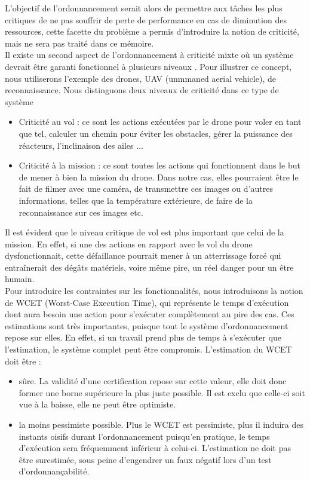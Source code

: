 \documentclass[11pt,a4paper,oneside]{book}
\theoremstyle{break}
\theoremstyle{breakplain}
\begin{document}
L'objectif de l'ordonnancement serait alors de permettre aux tâches les plus critiques de ne pas souffrir de perte de performance en cas de diminution des ressources, cette facette du problème a permis d'introduire la notion de criticité, mais ne sera pas traité dans ce mémoire.\\

Il existe un second aspect de l'ordonnancement à criticité mixte où un système devrait être garanti fonctionnel à plusieurs niveaux \cite{barhorst2009research}. Pour illustrer ce concept, nous utiliserons l'exemple des drones, UAV (unmmaned aerial vehicle), de reconnaissance. Nous distinguons deux niveaux de criticité dans ce type de système

\begin{itemize}
\item Criticité au vol : ce sont les actions exécutées par le drone pour voler en tant que tel, calculer un chemin pour éviter les obstacles, gérer la puissance des réacteurs, l'inclinaison des ailes ...
\item Criticité à la mission : ce sont toutes les actions qui fonctionnent dans le but de mener à bien la mission du drone. Dans notre cas, elles pourraient être le fait de filmer avec une caméra, de transmettre ces images ou d'autres informations, telles que la température extérieure, de faire de la reconnaissance sur ces images etc.\\
\end{itemize}

Il est évident que le niveau critique de vol est plus important que celui de la mission. En effet, si une des actions en rapport avec le vol du drone dysfonctionnait, cette défaillance pourrait mener à un atterrissage forcé qui entraînerait des dégâts matériels, voire même pire, un réel danger pour un être humain.\\

Pour introduire les contraintes sur les fonctionnalités, nous introduisons la notion de WCET (Worst-Case Execution Time), qui représente le temps d'exécution dont aura besoin une action pour s'exécuter complètement au pire des cas. Ces estimations sont très importantes, puisque tout le système d'ordonnancement repose sur elles. En effet, si un travail prend plus de temps à s'exécuter que l'estimation, le système complet peut être compromis. L'estimation du WCET doit être \cite{santy2012ordonnancement} :

\begin{itemize}
\item sûre. La validité d'une certification repose sur cette valeur, elle doit donc former une borne supérieure la plus juste possible. Il est exclu que celle-ci soit vue à la baisse, elle ne peut être optimiste.
\item la moins pessimiste possible. Plus le WCET est pessimiste, plus il induira des instants oisifs durant l'ordonnancement puisqu'en pratique, le temps d'exécution sera fréquemment inférieur à celui-ci. L'estimation ne doit pas être surestimée, sous peine d'engendrer un faux négatif lors d'un test d'ordonnançabilité.\\
\end{itemize}
\end{document}
